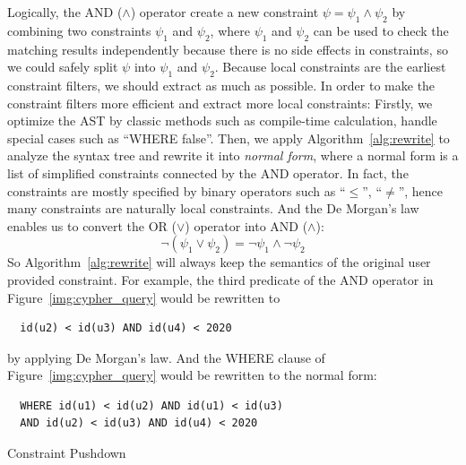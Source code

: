 Logically, the AND ($\land$) operator create a new constraint $\psi = \psi_1 \land \psi_2$ by combining two constraints $\psi_1$ and $\psi_2$,
where $\psi_1$ and $\psi_2$ can be used to check the matching results independently because there is no side effects in constraints,
so we could safely split $\psi$ into $\psi_1$ and $\psi_2$.
Because local constraints are the earliest constraint filters, we should extract as much as possible.
In order to make the constraint filters more efficient and extract more local constraints:
Firstly, we optimize the AST by classic methods such as compile-time calculation,
handle special cases such as ``{WHERE false}''.
Then, we apply Algorithm~\ref{alg:rewrite} to analyze the syntax tree and rewrite it into \emph{normal form},
where a normal form is a list of simplified constraints connected by the AND operator.
In fact, the constraints are mostly specified by binary operators such as ``$\le$'', ``$\ne$'',
hence many constraints are naturally local constraints.
And the De Morgan's law enables us to convert the OR ($\lor$) operator into AND ($\land$):
\begin{equation}
  \lnot (\psi_1 \lor \psi_2) = \lnot \psi_1 \land \lnot \psi_2
\end{equation}
So Algorithm~\ref{alg:rewrite} will always keep the semantics of the original user provided constraint.
For example, the third predicate of the AND operator in Figure~\ref{img:cypher_query} would be rewritten to
\begin{verbatim}
  id(u2) < id(u3) AND id(u4) < 2020
\end{verbatim}
by applying De Morgan's law.
And the WHERE clause of Figure~\ref{img:cypher_query} would be rewritten to the normal form:
\begin{verbatim}
  WHERE id(u1) < id(u2) AND id(u1) < id(u3)
  AND id(u2) < id(u3) AND id(u4) < 2020
\end{verbatim}

\begin{algorithm}[ht]
  \caption{Constraint Pushdown}\label{alg:push_down}
\end{algorithm}

